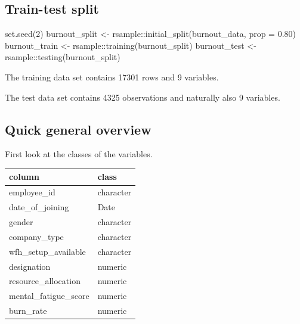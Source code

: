 \documentclass[
]{book}
\newenvironment{Shaded}{\begin{snugshade}}{\end{snugshade}}
\newcommand{\AttributeTok}[1]{\textcolor[rgb]{0.77,0.63,0.00}{#1}}
\newcommand{\DecValTok}[1]{\textcolor[rgb]{0.00,0.00,0.81}{#1}}
\newcommand{\FloatTok}[1]{\textcolor[rgb]{0.00,0.00,0.81}{#1}}
\newcommand{\FunctionTok}[1]{\textcolor[rgb]{0.00,0.00,0.00}{#1}}
\newcommand{\NormalTok}[1]{#1}
\newcommand{\OtherTok}[1]{\textcolor[rgb]{0.56,0.35,0.01}{#1}}
\newcommand{\SpecialCharTok}[1]{\textcolor[rgb]{0.00,0.00,0.00}{#1}}
\begin{document}
\hypertarget{train-test-split}{%
\subsection{Train-test split}\label{train-test-split}}

\begin{Shaded}
\begin{Highlighting}[]
\FunctionTok{set.seed}\NormalTok{(}\DecValTok{2}\NormalTok{)}
\NormalTok{burnout\_split }\OtherTok{\textless{}{-}}\NormalTok{ rsample}\SpecialCharTok{::}\FunctionTok{initial\_split}\NormalTok{(burnout\_data, }\AttributeTok{prop =} \FloatTok{0.80}\NormalTok{)}
\NormalTok{burnout\_train }\OtherTok{\textless{}{-}}\NormalTok{ rsample}\SpecialCharTok{::}\FunctionTok{training}\NormalTok{(burnout\_split)}
\NormalTok{burnout\_test  }\OtherTok{\textless{}{-}}\NormalTok{ rsample}\SpecialCharTok{::}\FunctionTok{testing}\NormalTok{(burnout\_split)}
\end{Highlighting}
\end{Shaded}

The training data set contains 17301 rows and 9 variables.

The test data set contains 4325 observations and naturally also 9 variables.

\hypertarget{quick-general-overview}{%
\subsection{Quick general overview}\label{quick-general-overview}}

First look at the classes of the variables.

\begin{tabular}{l|l}
\hline
column & class\\
\hline
employee\_id & character\\
\hline
date\_of\_joining & Date\\
\hline
gender & character\\
\hline
company\_type & character\\
\hline
wfh\_setup\_available & character\\
\hline
designation & numeric\\
\hline
resource\_allocation & numeric\\
\hline
mental\_fatigue\_score & numeric\\
\hline
burn\_rate & numeric\\
\hline
\end{tabular}
\end{document}
